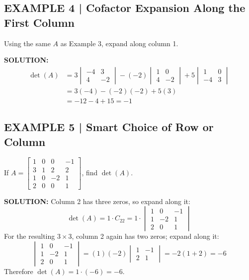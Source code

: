 \documentclass{article}
\theoremstyle{mystyle}
\begin{document}
\subsection*{EXAMPLE 4 | Cofactor Expansion Along the First Column}
Using the same $A$ as Example 3, expand along column 1.

\textbf{SOLUTION:}
\begin{align*}
\det(A)&=3\begin{vmatrix}-4&3\\4&-2\end{vmatrix}-(-2)\begin{vmatrix}1&0\\4&-2\end{vmatrix}+5\begin{vmatrix}1&0\\-4&3\end{vmatrix}\\
&=3(-4)-(-2)(-2)+5(3)\\
&=-12-4+15=\boxed{-1}
\end{align*}

\subsection*{EXAMPLE 5 | Smart Choice of Row or Column}
If $A=\begin{bmatrix}1&0&0&-1\\3&1&2&2\\1&0&-2&1\\2&0&0&1\end{bmatrix}$, find $\det(A)$.

\textbf{SOLUTION:} Column 2 has three zeros, so expand along it:
\[
\det(A)=1\cdot C_{22}=1\cdot\begin{vmatrix}1&0&-1\\1&-2&1\\2&0&1\end{vmatrix}
\]
For the resulting $3\times3$, column 2 again has two zeros; expand along it:
\[
\begin{vmatrix}1&0&-1\\1&-2&1\\2&0&1\end{vmatrix}=(1)(-2)\begin{vmatrix}1&-1\\2&1\end{vmatrix}=-2(1+2)=-6
\]
Therefore $\det(A)=1\cdot(-6)=\boxed{-6}$.
\end{document}
